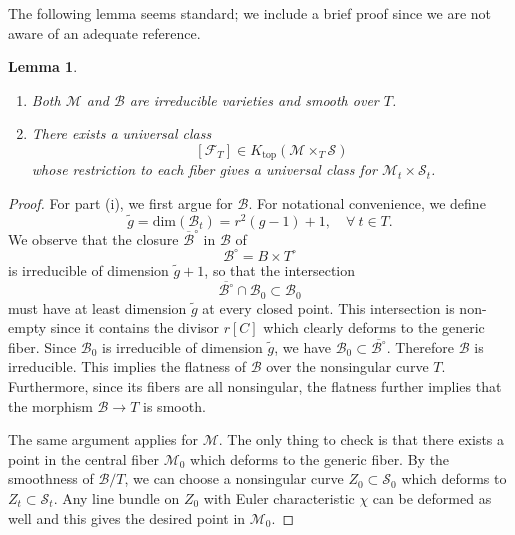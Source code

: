\documentclass[11pt]{amsart}
\theoremstyle{plain}
\newtheorem{lem}[thm]{Lemma}
\theoremstyle{definition}
\theoremstyle{remark}
\newcommand{\CB}{{\mathcal B}}
\newcommand{\CF}{{\mathcal F}}
\newcommand{\CM}{{\mathcal M}}
\newcommand{\CS}{{\mathcal S}}
\begin{document}
The following lemma seems standard; we include a brief proof  since we are not aware of an adequate reference.
\begin{lem}\label{lem4.1}
\begin{enumerate}

\item[(i)] Both $\CM$ and $\CB$ are irreducible varieties and smooth over $T$.
\item[(ii)] There exists a universal class 
\[
[\CF_T] \in K_{\mathrm{top}}(\CM\times_{T} \CS)
\]
whose restriction to each fiber gives a universal class for $\CM_t \times \CS_t$.
\end{enumerate}

\end{lem}
\begin{proof}

For part (i), we first argue for $\CB$. For notational convenience, we define
\[
\tilde{g} = \mathrm{dim}(\CB_t) = r^2(g-1)+1, \quad \forall~t \in T.
\]
We observe that the closure $\overline\CB^{\circ}$ in $\CB$ of 
\[
\CB^{\circ} = B \times T^\circ
\]
is irreducible of dimension $\tilde{g}+1$, so that the intersection 
\[
\overline{\CB^{\circ}}\cap \CB_0 \subset \CB_0
\]
must have at least dimension $\tilde{g}$ at every closed point.  This intersection is non-empty since it contains the divisor $r[C]$ which clearly deforms to the generic fiber. Since $\CB_0$ is irreducible of dimension $\tilde{g}$, we have $\CB_0 \subset \overline{\CB^{\circ}}$. Therefore $\CB$ is irreducible. This implies the flatness of $\CB$ over the nonsingular curve $T$. Furthermore, since its fibers are all nonsingular, the flatness further implies that the morphism $\CB \to T$ is smooth.

The same argument applies for $\CM$. The only thing to check is that there exists a point in the central fiber $\CM_0$ which deforms to the generic fiber.  By the smoothness of $\CB/T$,  we can choose a nonsingular curve $Z_0 \subset \CS_0$ which deforms to $Z_t \subset \CS_t$.  Any line bundle on $Z_0$ with Euler characteristic $\chi$ can be deformed as well and this gives the desired point in $\CM_0$. 



\end{proof}
\end{document}
